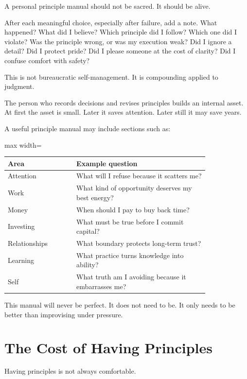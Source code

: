 A personal principle manual should not be sacred. It should be alive.

After each meaningful choice, especially after failure, add a note. What happened? What did I believe? Which principle did I follow? Which one did I violate? Was the principle wrong, or was my execution weak? Did I ignore a detail? Did I protect pride? Did I please someone at the cost of clarity? Did I confuse comfort with safety?

This is not bureaucratic self-management. It is compounding applied to judgment.

The person who records decisions and revises principles builds an internal asset. At first the asset is small. Later it saves attention. Later still it may save years.

A useful principle manual may include sections such as:

\begin{center}
\begin{adjustbox}{max width=\linewidth}
\begin{tabular}{p{0.28\linewidth}p{0.54\linewidth}}
\hline
Area & Example question \\
\hline
Attention & What will I refuse because it scatters me? \\
Work & What kind of opportunity deserves my best energy? \\
Money & When should I pay to buy back time? \\
Investing & What must be true before I commit capital? \\
Relationships & What boundary protects long-term trust? \\
Learning & What practice turns knowledge into ability? \\
Self & What truth am I avoiding because it embarrasses me? \\
\hline
\end{tabular}
\end{adjustbox}
\end{center}

This manual will never be perfect. It does not need to be. It only needs to be better than improvising under pressure.

\section*{The Cost of Having Principles}

Having principles is not always comfortable.


